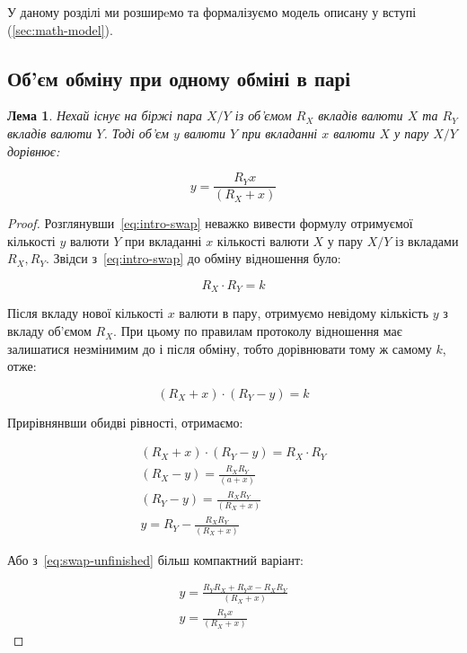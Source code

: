 \documentclass[14pt]{extarticle}
\newtheorem{lemma}{Лема}
\begin{document}
У даному розділі ми розширeмо та формалізуємо модель описану у вступі
(\ref{sec:math-model}).

\subsection{Об'єм обміну при одному обміні в парі}

\begin{lemma} Нехай існує на біржі пара \(X/Y\) із об'ємом \(R_{X}\) вкладів
	валюти \(X\) та \(R_{Y}\) вкладів валюти \(Y\). Тоді об'єм \(y\) валюти \(Y\)
	при вкладанні \(x\) валюти \(X\) у пару \(X/Y\) дорівнює:

	\begin{equation}\label{eq:swap}
		y = \frac{R_{Y}x}{(R_{X} + x)}
	\end{equation}
\end{lemma}

\begin{proof}
	Розглянувши~\eqref{eq:intro-swap} неважко вивести формулу отримуємої кількості
	\(y\) валюти \(Y\) при вкладанні \(x\) кількості валюти \(X\) у пару \(X/Y\)
	із вкладами \(R_{X}, R_{Y}\). Звідси з~\eqref{eq:intro-swap} до обміну
	відношення було:

	\begin{equation*}
		R_{X} \cdot R_{Y} = k
	\end{equation*}

	Після вкладу нової кількості \(x\) валюти в пару, отримуємо невідому кількість
	\(y\) з вкладу об'ємом \(R_{X}\). При цьому по правилам протоколу
	відношення має залишатися незмінимим до і після обміну, тобто дорівнювати тому
	ж самому \(k\), отже:

	\begin{equation*}
		(R_{X} + x) \cdot (R_{Y} - y) = k
	\end{equation*}

	Прирівнянвши обидві рівності, отримаємо:

	\begin{equation}\label{eq:swap-unfinished}
		\begin{aligned}
			(R_{X} + x) \cdot (R_{Y} - y) = R_{X} \cdot R_{Y} \\
			(R_{X} - y) = \frac{R_{X} R_{Y}}{(a + x)}         \\
			(R_{Y} - y) = \frac{R_{X} R_{Y}}{(R_{X} + x)}     \\
			y = R_{Y} - \frac{R_{X} R_{Y}}{(R_{X} + x)}
		\end{aligned}
	\end{equation}

	Або з~\eqref{eq:swap-unfinished} більш компактний варіант:

	\begin{equation}
		\begin{aligned}
			y = \frac{R_{Y} R_{X} + R_{Y}x - R_{X}R_{Y}}{(R_{X} + x)} \\
			y = \frac{R_{Y}x}{(R_{X} + x)}
		\end{aligned}
	\end{equation}
\end{proof}
\end{document}

